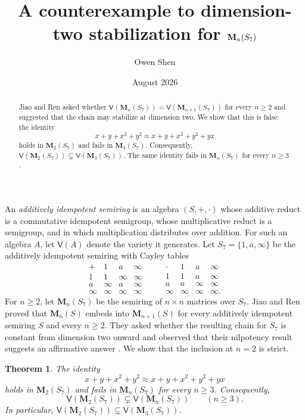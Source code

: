 \documentclass{amsart}
\title[Dimension-two stabilization for $\M_n(S_7)$]
{A counterexample to dimension-two stabilization for $\M_n(S_7)$}
\author{Owen Shen}
\date{August 2026}
\newcommand{\M}{\mathbf{M}}
\newcommand{\V}{\mathsf{V}}
\newtheorem{theorem}{Theorem}
\begin{document}
\begin{abstract}
Jiao and Ren asked whether
$\V(\M_n(S_7))=\V(\M_{n+1}(S_7))$ for every $n\geq 2$ and suggested
that the chain may stabilize at dimension two. We show that this is false:
the identity
\[
 x+y+x^2+y^2 \approx x+y+x^2+y^2+yx
\]
holds in $\M_2(S_7)$ and fails in $\M_3(S_7)$. Consequently,
$\V(\M_2(S_7))\subsetneq\V(\M_3(S_7))$. The same identity fails in
$\M_n(S_7)$ for every $n\geq 3$.
\end{abstract}

\maketitle

An \emph{additively idempotent semiring} is an algebra $(S,+,\cdot)$
whose additive reduct is a commutative idempotent semigroup, whose
multiplicative reduct is a semigroup, and in which multiplication distributes
over addition. For such an algebra $A$, let $\V(A)$ denote the variety it
generates. Let $S_7=\{1,a,\infty\}$ be the additively idempotent semiring
with Cayley tables
\[
\begin{array}{c|ccc}
 + & 1 & a & \infty \\ \hline
 1 & 1 & \infty & \infty \\
 a & \infty & a & \infty \\
 \infty & \infty & \infty & \infty
\end{array}
\qquad
\begin{array}{c|ccc}
 \cdot & 1 & a & \infty \\ \hline
 1 & 1 & a & \infty \\
 a & a & \infty & \infty \\
 \infty & \infty & \infty & \infty .
\end{array}
\]
For $n\geq 2$, let $\M_n(S_7)$ be the semiring of $n\times n$ matrices
over $S_7$. Jiao and Ren proved that $\M_n(S)$ embeds into
$\M_{n+1}(S)$ for every additively idempotent semiring $S$ and every
$n\geq 2$. They asked whether the resulting chain for $S_7$ is constant
from dimension two onward and observed that their nilpotency result suggests
an affirmative answer \cite[Theorem~2.1 and Section~5]{JiaoRen}. We show
that the inclusion at $n=2$ is strict.

\begin{theorem}\label{thm:main}
The identity
\begin{equation}\label{eq:identity}
 x+y+x^2+y^2 \approx x+y+x^2+y^2+yx
\end{equation}
holds in $\M_2(S_7)$ and fails in $\M_n(S_7)$ for every $n\geq 3$.
Consequently,
\[
 \V(\M_2(S_7))\subsetneq\V(\M_n(S_7))
 \qquad(n\geq 3).
\]
In particular,
$\V(\M_2(S_7))\subsetneq\V(\M_3(S_7))$.
\end{theorem}
\end{document}
